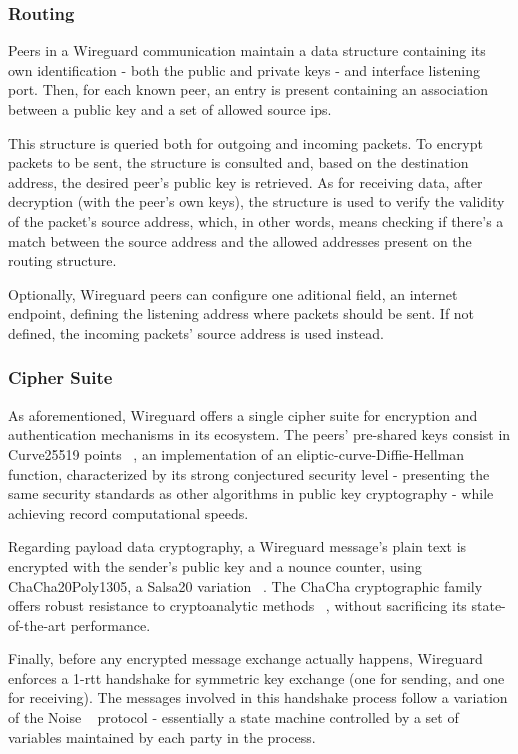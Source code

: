 \documentclass[11pt,twoside,a4paper]{report}
\begin{document}
\subsubsection{Routing}

Peers in a Wireguard communication maintain a data structure containing its own identification - both the public and private keys - and interface listening port. Then, for each known peer, an entry is present containing an association between a public key and a set of allowed source ips.

This structure is queried both for outgoing and incoming packets. To encrypt packets to be sent, the structure is consulted and, based on the destination address, the desired peer's public key is retrieved. As for receiving data, after decryption (with the peer's own keys), the structure is used to verify the validity of the packet's source address, which, in other words, means checking if there's a match between the source address and the allowed addresses present on the routing structure.

Optionally, Wireguard peers can configure one aditional field, an internet endpoint, defining the listening address where packets should be sent. If not defined, the incoming packets' source address is used instead.

\subsubsection{Cipher Suite}

As aforementioned, Wireguard offers a single cipher suite for encryption and authentication mechanisms in its ecosystem. The peers' pre-shared keys consist in  Curve25519 points ~\cite{bernstein2006curve25519}, an implementation of an eliptic-curve-Diffie-Hellman function, characterized by its strong conjectured security level - presenting the same security standards as other algorithms in public key cryptography - while achieving record computational speeds.

Regarding payload data cryptography, a Wireguard message's plain text is encrypted with the sender's public key and a nounce counter, using ChaCha20Poly1305, a Salsa20 variation ~\cite{bernstein2008chacha}. The ChaCha cryptographic family offers robust resistance to cryptoanalytic methods ~\cite{cryptoeprint:2014/613}, without sacrificing its state-of-the-art performance.

Finally, before any encrypted message exchange actually happens, Wireguard enforces a 1-\ac{rtt} handshake for symmetric key exchange (one for sending, and one for receiving). The messages involved in this handshake process follow a variation of the Noise ~\cite{perrin2018noise} protocol - essentially a state machine controlled by a set of variables maintained by each party in the process.
\end{document}
